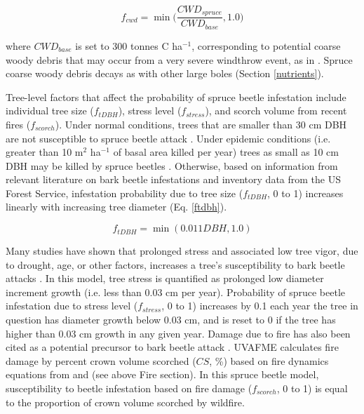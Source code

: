 \documentclass[a4paper, 12pt] {report}
\begin{document}
\begin{equation} \label{fcwd}
f_{cwd} = \min\Big(\frac{CWD_{spruce}}{CWD_{base}}, 1.0\Big)
\end{equation}

where $CWD_{base}$ is set to 300 tonnes C ha$^{-1}$, corresponding to potential coarse woody debris that may occur from a very severe windthrow event, as in . Spruce coarse woody debris decays as with other large boles (Section \ref{nutrients}).

Tree-level factors that affect the probability of spruce beetle infestation include individual tree size ($f_{tDBH}$), stress level ($f_{stress}$), and scorch volume from recent fires ($f_{scorch}$). Under normal conditions, trees that are smaller than 30 cm DBH are not susceptible to spruce beetle attack \cite{deroseDroughtdrivenDisturbanceHistory2012}. Under epidemic conditions (i.e. greater than 10 m$^2$ ha$^{-1}$ of basal area killed per year) trees as small as 10 cm DBH may be killed by spruce beetles \cite{peetForestVegetationColorado1981, veblenDisturbanceRegimeDisturbance1994, deroseDroughtdrivenDisturbanceHistory2012}. Otherwise, based on information from relevant literature on bark beetle infestations  and inventory data from the US Forest Service, infestation probability due to tree size ($f_{tDBH}$, 0 to 1) increases linearly with increasing tree diameter (Eq. \ref{ftdbh}). 

\begin{equation} \label{ftdbh}
f_{tDBH} = \min(0.011DBH, 1.0)
\end{equation}

Many studies have shown that prolonged stress and associated low tree vigor, due to drought, age, or other factors, increases a tree’s susceptibility to bark beetle attacks . In this model, tree stress is quantified as prolonged low diameter increment growth (i.e. less than 0.03 cm per year). Probability of spruce beetle infestation due to stress level ($f_{stress}$, 0 to 1) increases by 0.1 each year the tree in question has diameter growth below 0.03 cm, and is reset to 0 if the tree has higher than 0.03 cm growth in any given year. Damage due to fire has also been cited as a potential precursor to bark beetle attack . UVAFME calculates fire damage by percent crown volume scorched ($CS$, \%) based on fire dynamics equations from  and  (see above Fire section). In this spruce beetle model, susceptibility to beetle infestation based on fire damage ($f_{scorch}$, 0 to 1) is equal to the proportion of crown volume scorched by wildfire. 
\end{document}
